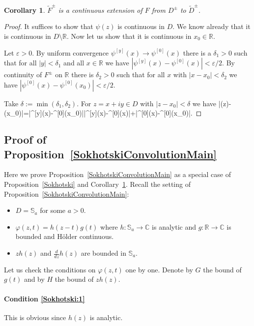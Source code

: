 \documentclass[12pt]{article}
\theoremstyle{plain}
\newtheorem{corollary}[theorem]{Corollary}
\theoremstyle{definition}
\numberwithin{equation}{section}
\numberwithin{theorem}{section}
\def\be#1\ee{\begin{equation}#1\end{equation}}
\newcommand\eps           {\varepsilon}
\begin{document}
\begin{corollary} \label{corollarySokhotski} 
$\tilde F^\pm$ is a continuous extension of $F$ from 
 $D^\pm$ to $\tilde D^\pm$.
\end{corollary}

\begin{proof}
It suffices to show that $\psi(z)$ is continuous in $D$. We know already that it is continuous in $D\setminus \mathbb{R}$. Now let us show that it is continuous in $x_0\in\mathbb{R}$.

Let $\eps>0$.
By uniform convergence $\psi^{[y]}(x)\rightarrow\psi^{[0]}(x)$ there is a $\delta_1>0$ such that for all $|y|<\delta_1$ and all $x \in \mathbb{R}$ we have $|\psi^{[y]}(x)-\psi^{[0]}(x)|<\eps/2$.
By continuity of $F^\pm$ on $\mathbb{R}$ there is $\delta_2>0$ such that for all $x$ with $|x-x_0| < \delta_2$ we have $|\psi^{[0]}(x)-\psi^{[0]}(x_0)|<\eps/2$.

Take $\delta := \min(\delta_1,\delta_2)$. For $z = x + iy \in D$ with $|z-x_0|<\delta$ we have
\be
\left|\psi(z)-\psi(x_0)\right|=\left|\psi^{[y]}(x)-\psi^{[0]}(x_0)\right|\leq|\psi^{[y]}(x)-\psi^{[0]}(x)|+|\psi^{[0]}(x)-\psi^{[0]}(x_0)|\leq \varepsilon. \qedhere \ee
\end{proof}


\subsection{Proof of Proposition~\ref{SokhotskiConvolutionMain}} \label{AppendixPropProof}

Here we prove Proposition~\ref{SokhotskiConvolutionMain} as a special case of Proposition~\ref{Sokhotski} and Corollary~\ref{corollarySokhotski}.
Recall the setting of Proposition~\ref{SokhotskiConvolutionMain}:
\begin{itemize}
\item $D=\mathbb{S}_a$ for some $a>0$.
\item $\varphi(z,t)=h(z-t)g(t)$ where $h:\mathbb{S}_a\rightarrow\mathbb{C}$ is analytic and $g:\mathbb{R}\rightarrow\mathbb{C}$ is bounded and H\"older continuous.
\item $zh(z)$ and $\frac{d}{dz}h(z)$ are bounded in $\mathbb{S}_a$.
\end{itemize}
Let us check the conditions on $\varphi(z,t)$ one by one.
Denote by $G$ the bound of $g(t)$ and by $H$ the bound of $zh(z)$. 

\paragraph{Condition \ref{Sokhotski:1}} 
This is obvious since $h(z)$ is analytic.
\end{document}
